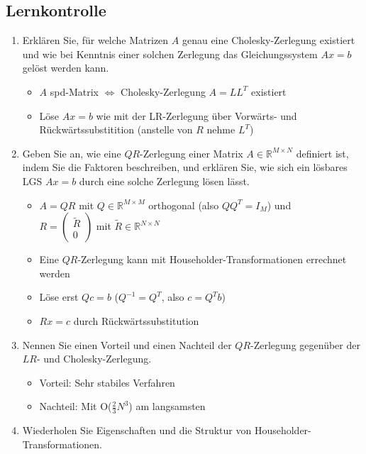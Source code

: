 \documentclass[]{article}
\begin{document}
\subsection{Lernkontrolle}
	\begin{enumerate}
		\item Erklären Sie, für welche Matrizen $A$ genau eine Cholesky-Zerlegung existiert und wie bei Kenntnis einer solchen Zerlegung das Gleichungssystem $Ax=b$ gelöst werden kann.
			\begin{itemize}
				\item $A$ spd-Matrix $\Leftrightarrow$ Cholesky-Zerlegung $A=LL^T$ existiert
				\item Löse $Ax=b$ wie mit der LR-Zerlegung über Vorwärts- und Rückwärtssubstitition (anstelle von $R$ nehme $L^T$)
			\end{itemize}
		\item Geben Sie an, wie eine $QR$-Zerlegung einer Matrix $A \in \mathbb{R}^{M \times N}$ definiert ist, indem Sie die Faktoren beschreiben, und erklären Sie, wie sich ein lösbares LGS $Ax=b$ durch eine solche Zerlegung lösen lässt.
			\begin{itemize}
				\item $A=QR$ mit $Q \in \mathbb{R}^{M \times M}$ orthogonal (also $QQ^T = I_M$) und \\
				$R = \left (\begin{array}{r} \tilde{R} \\ 0 \end{array} \right)$ mit $\tilde{R} \in \mathbb{R}^{N \times N}$
				\item Eine $QR$-Zerlegung kann mit Householder-Transformationen errechnet werden
				\item Löse erst $Qc=b$ ($Q^{-1} = Q^T$, also $c = Q^Tb$)
				\item $Rx=c$ durch Rückwärtssubstitution
			\end{itemize}
		\item Nennen Sie einen Vorteil und einen Nachteil der $QR$-Zerlegung gegenüber der $LR$- und Cholesky-Zerlegung.
			\begin{itemize}
				\item Vorteil: Sehr stabiles Verfahren
				\item Nachteil: Mit O($\frac{2}{3} N^3$) am langsamsten
			\end{itemize}
		\item Wiederholen Sie Eigenschaften und die Struktur von Householder-Transformationen.
			\begin{itemize}

\end{itemize}
\end{enumerate}
\end{document}

